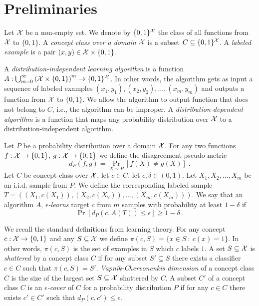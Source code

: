 \section{Preliminaries}
\label{section:preliminaries}

Let $\mathcal{X}$ be a non-empty set. We denote by $\{0,1\}^{\mathcal{X}}$ the class of all
functions from $\mathcal{X}$ to $\{0,1\}$. A \emph{concept class over a domain $\mathcal{X}$} is a
subset $C \subseteq \{0,1\}^{\mathcal{X}}$. A \emph{labeled example} is a pair $(x,y) \in
\mathcal{X} \times \{0,1\}$.

A \emph{distribution-independent learning algorithm} is a function
$A:\bigcup_{m=0}^\infty \left(\mathcal{X} \times \{0,1\} \right)^m \to \{0,1\}^{\mathcal{X}}$. In
other words, the algorithm gets as input a sequence of labeled examples $(x_1,
y_1), (x_2, y_2), \dots, (x_m, y_m)$ and outputs a function from $\mathcal{X}$ to
$\{0,1\}$. We allow the algorithm to output function that does not belong to
$C$, i.e., the algorithm can be improper. A \emph{distribution-dependent
algorithm} is a function that maps any probability distribution over $\mathcal{X}$ to a
distribution-independent algorithm.

Let $P$ be a probability distribution over a domain $\mathcal{X}$. For any two functions
$f:\mathcal{X} \to \{0,1\}$, $g:\mathcal{X} \to \{0,1\}$ we define the disagreement pseudo-metric
$$
d_P(f,g) = \Pr_{X \sim P}[f(X) \neq g(X)] \; .
$$
Let $C$ be concept class over $\mathcal{X}$, let $c \in C$, let $\epsilon, \delta \in (0,1)$.
Let  $X_1, X_2, \dots, X_m$ be an i.i.d. sample from $P$. We define the corresponding
labeled sample $T = ((X_1, c(X_1)), (X_2, c(X_2)), \dots, (X_m, c(X_m)))$.
We say that an algorithm $A$, \emph{$\epsilon$-learns} target $c$ from $m$ samples
with probability at least $1 - \delta$ if
$$
\Pr \left[d_P(c,A(T)) \le \epsilon \right]  \ge 1 - \delta \; .
$$

We recall the standard definitions from learning theory. For any concept $c:\mathcal{X}
\to \{0,1\}$ and any $S \subseteq \mathcal{X}$ we define $\pi(c,S) = \{x \in S ~:~ c(x) =
1 \}$. In other words, $\pi(c,S)$ is the set of examples in $S$ which $c$ labels
$1$. A set $S \subseteq \mathcal{X}$ is \emph{shattered} by a concept class $C$ if for
any subset $S' \subseteq S$ there exists a classifier $c \in C$ such that
$\pi(c,S) = S'$. \emph{Vapnik-Chervonenkis dimension} of a concept class $C$ is
the size of the largest set $S \subseteq \mathcal{X}$ shattered by $C$. A subset $C'$ of
a concept class $C$ is an \emph{$\epsilon$-cover} of $C$ for a probability
distribution $P$ if for any $c \in C$ there exists $c' \in C'$ such that
$d_P(c,c') \le \epsilon$.

